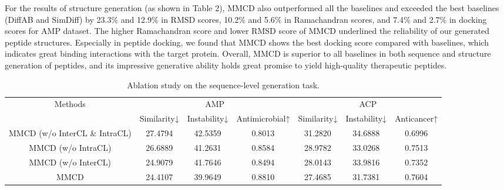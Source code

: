 \documentclass[letterpaper]{article} %
\begin{document}
For the results of structure generation (as shown in Table 2), MMCD also outperformed all the baselines and exceeded the best baselines (DiffAB and SimDiff) by 23.3$\%$ and 12.9$\%$ in RMSD scores, 10.2$\%$ and 5.6$\%$ in Ramachandran scores, and 7.4$\%$ and 2.7$\%$ in docking scores for AMP dataset. The higher Ramachandran score and lower RMSD score of MMCD underlined the reliability of our generated peptide structures. Especially in peptide docking, we found that MMCD shows the best docking score compared with baselines, which indicates great binding interactions with the target protein. Overall, MMCD is superior to all baselines in both sequence and structure generation of peptides, and its impressive generative ability holds great promise to yield high-quality therapeutic peptides.

\begin{table}[ht]
\centering
\setlength{\tabcolsep}{6pt}
\begin{tabular}{ccccccc}
\hline
\multirow{2}{*}{Methods} & \multicolumn{3}{c}{AMP}                     & \multicolumn{3}{c}{ACP}                  \\ \cmidrule(r){2-4} \cmidrule(r){5-7}
                         & Similarity↓ & Instability↓ & Antimicrobial↑ & Similarity↓ & Instability↓ & Anticancer↑ \\ \hline
MMCD (w/o InterCL \& IntraCL)  & 27.4794     & 42.5359      & 0.8013         & 31.2820     & 34.6888      & 0.6996      \\
MMCD (w/o IntraCL)             & 26.6889     & 41.2631      & 0.8584         & 28.9782     & 33.0268      & 0.7513      \\
MMCD (w/o InterCL)             & 24.9079     & 41.7646      & 0.8494         & 28.0143     & 33.9816      & 0.7352      \\
MMCD                           & 24.4107     & 39.9649      & 0.8810         & 27.4685     & 31.7381      & 0.7604      \\ \hline
\end{tabular}
\caption{Ablation study on the sequence-level generation task.} 
\end{table}
\end{document}
